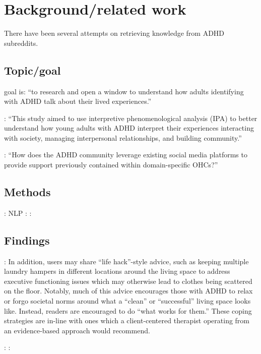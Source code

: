 \section{Background/related work}
There have been several attempts on retrieving knowledge from ADHD subreddits.

\subsection{Topic/goal}
\citeauthor{scalzo2024using} goal is: ``to research and open a window to understand how adults identifying with ADHD talk about their lived experiences.''

\citeauthor{ginapp2023experiences}: ``This study aimed to use interpretive phenomenological analysis (IPA) to better understand how young adults with ADHD interpret their experiences interacting with society, managing interpersonal relationships, and building community.''

\citeauthor{eagle2023you}: ``How does the ADHD community leverage existing social media platforms to provide support previously contained within domain-specific OHCs?''

\subsection{Methods}
\citeauthor{scalzo2024using}: NLP
\citeauthor{ginapp2023experiences}: 
\citeauthor{eagle2023you}:

\subsection{Findings}
\citeauthor{scalzo2024using}:
In addition, users may share “life hack”-style advice, such as keeping multiple laundry hampers in different locations around the living space to address executive functioning issues which may otherwise lead to clothes being scattered on the floor. Notably, much of this advice encourages those with ADHD to relax or forgo societal norms around what a “clean” or “successful” living space looks like. Instead, readers are encouraged to do “what works for them.” These coping strategies are in-line with ones which a client-centered therapist operating from an evidence-based approach would recommend.

\citeauthor{ginapp2023experiences}: 
\citeauthor{eagle2023you}:
